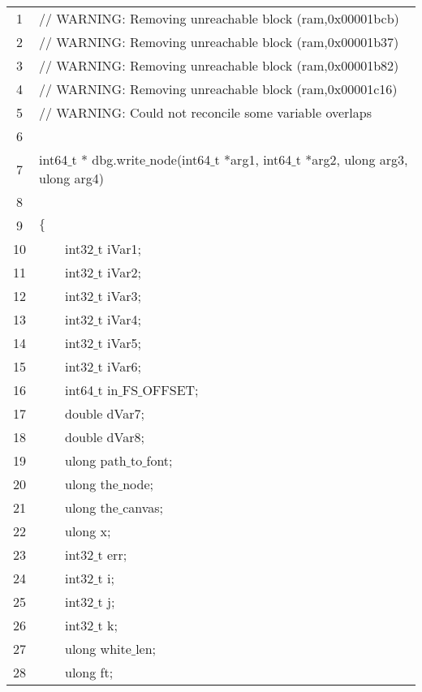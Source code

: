 \documentclass{report}
\newcommand{\tab}{$\quad$}
\newcommand{\csfont}[1]{\fontfamily{cmtt}\selectfont #1}
\begin{document}
\begin{tabular}{c|l}
\hline
  1 & {\csfont{// WARNING: Removing unreachable block (ram,0x00001bcb)}} \\
  2 & {\csfont{// WARNING: Removing unreachable block (ram,0x00001b37)}} \\
  3 & {\csfont{// WARNING: Removing unreachable block (ram,0x00001b82)}} \\
  4 & {\csfont{// WARNING: Removing unreachable block (ram,0x00001c16)}} \\
  5 & {\csfont{// WARNING: Could not reconcile some variable overlaps}} \\
  6 & {\csfont{}} \\
  7 & {\csfont{int64$\_$t * dbg.write$\_$node(int64$\_$t *arg1, int64$\_$t *arg2, ulong arg3, ulong arg4)}} \\
  8 & {\csfont{}} \\
  9 & {\csfont{$\{$}} \\
  10 & {\csfont{\tab \tab int32$\_$t iVar1;}} \\
  11 & {\csfont{\tab \tab int32$\_$t iVar2;}} \\
  12 & {\csfont{\tab \tab int32$\_$t iVar3;}} \\
  13 & {\csfont{\tab \tab int32$\_$t iVar4;}} \\
  14 & {\csfont{\tab \tab int32$\_$t iVar5;}} \\
  15 & {\csfont{\tab \tab int32$\_$t iVar6;}} \\
  16 & {\csfont{\tab \tab int64$\_$t in$\_$FS$\_$OFFSET;}} \\
  17 & {\csfont{\tab \tab double dVar7;}} \\
  18 & {\csfont{\tab \tab double dVar8;}} \\
  19 & {\csfont{\tab \tab ulong path$\_$to$\_$font;}} \\
  20 & {\csfont{\tab \tab ulong the$\_$node;}} \\
  21 & {\csfont{\tab \tab ulong the$\_$canvas;}} \\
  22 & {\csfont{\tab \tab ulong x;}} \\
  23 & {\csfont{\tab \tab int32$\_$t err;}} \\
  24 & {\csfont{\tab \tab int32$\_$t i;}} \\
  25 & {\csfont{\tab \tab int32$\_$t j;}} \\
  26 & {\csfont{\tab \tab int32$\_$t k;}} \\
  27 & {\csfont{\tab \tab ulong white$\_$len;}} \\
  28 & {\csfont{\tab \tab ulong ft;}} \\

\end{tabular}
\end{document}
